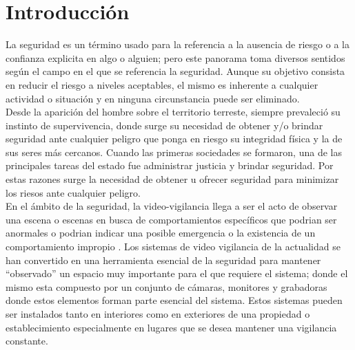 \chapter{Introducción}

La seguridad es un término usado para la referencia a la ausencia de riesgo o a la confianza explicita en algo o alguien; pero este panorama toma diversos sentidos según el campo en el que se referencia la seguridad. Aunque su objetivo consista en reducir el riesgo a niveles aceptables, el mismo es inherente a cualquier actividad o situación y en ninguna circunstancia puede ser eliminado.\\

Desde la aparición del hombre sobre el territorio terreste, siempre prevaleció su instinto de supervivencia, donde surge su necesidad de obtener y/o brindar seguridad ante cualquier peligro que ponga en riesgo su integridad física y la de sus seres más cercanos. Cuando las primeras sociedades se formaron, una de las principales tareas del estado fue administrar justicia y brindar seguridad. Por estas razones surge la necesidad de obtener u ofrecer seguridad para minimizar los riesos ante cualquier peligro.\\

En el ámbito de la seguridad, la video-vigilancia llega a ser el acto de observar una escena o escenas en busca de comportamientos específicos que podrian ser anormales o podrian indicar una posible emergencia o la existencia de un comportamiento impropio \cite{NORMAN:201795}. Los sistemas de video vigilancia de la actualidad se han convertido en una herramienta esencial de la seguridad para mantener ``observado'' un espacio muy importante para el que requiere el sistema; donde el mismo esta compuesto por un conjunto de cámaras, monitores y grabadoras donde estos elementos forman parte esencial del sistema. Estos sistemas pueden ser instalados tanto en interiores como en exteriores de una propiedad o establecimiento especialmente en lugares que se desea mantener una vigilancia constante.\\


